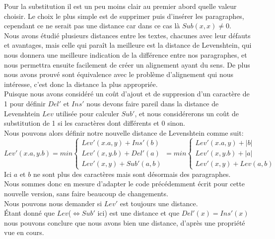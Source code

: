 \documentclass{article}
\begin{document}
Pour la substitution il est un peu moins clair au premier abord quelle
valeur choisir. Le choix le plus simple est de supprimer puis d'insérer les
paragraphes, cependant ce ne serait pas une distance car dans ce cas là
$Sub(x,x) \neq 0$.\\
Nous avons étudié plusieurs distances entre les textes, chacunes avec leur
défauts et avantages, mais celle qui paraît la meilleure est la distance de
Levenshtein, qui nous donnera une meilleure indication de la différence entre
nos paragraphes, et nous permettra ensuite facilement de créer un alignement
ayant du sens. De plus nous avons prouvé sont équivalence avec le problème
d'alignement qui nous intéresse, c'est donc la distance la plus appropriée.\\
Puisque nous avons considéré un coût d'ajout et de suppresion d'un caractère de
1 pour définir $Del'$ et $Ins'$ nous devons faire pareil dans la distance de
Levenshtein $Lev$ utilisée pour calculer $Sub'$, et nous considérerons un 
coût de substitution de 1 si les caractères dont différents et 0 sinon.\\

Nous pouvons alors définir notre nouvelle distance de Levenshtein comme suit:
\begin{equation*}
	Lev'(x.a,y.b)= min
		\begin{cases}
			Lev'(x.a,y) + Ins'(b)\\
			Lev'(x,y.b) + Del'(a)\\
			Lev'(x,y) + Sub'(a,b)
		\end{cases}
		= min
		\begin{cases}
			Lev'(x.a,y) + \lvert b \rvert\\
			Lev'(x,y.b) + \lvert a \rvert\\
			Lev'(x,y) + Lev(a,b)
		\end{cases}
\end{equation*}
Ici $a$ et $b$ ne sont plus des caractères mais sont désormais des
paragraphes.\\
Nous sommes donc en mesure d'adapter le code précédemment écrit pour cette
nouvelle version, sans faire beaucoup de changements.\\

Nous pouvons nous demander si $Lev'$ est toujours une distance.\\
Étant donné que $Lev$($\iff Sub'$ ici) est une distance et que $Del'(x)=Ins'(x)$ nous pouvons
conclure que nous avons bien une distance, d'après une propriété vue en cours.\\
\end{document}
